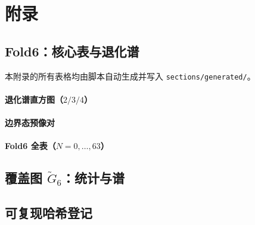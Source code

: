 \section{附录}\label{sec:appendix}

\subsection{Fold6：核心表与退化谱}\label{app:fold6-tables}
本附录的所有表格均由脚本自动生成并写入 \texttt{sections/generated/}。

\paragraph{退化谱直方图（$2/3/4$）}


\paragraph{边界态预像对}


\paragraph{Fold6 全表（$N=0,\dots,63$）}
{\scriptsize

}

{\scriptsize

}

\subsection{覆盖图 $\widetilde G_6$：统计与谱}\label{app:cover-graph}


\subsection{可复现哈希登记}\label{app:hash-registry}


